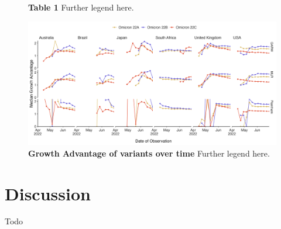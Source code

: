 \documentclass[11pt,oneside,letterpaper]{article}
\begin{document}
\begin{figure}[h]
	\caption{\textbf{Table 1}
	Further legend here.
	}
	\label{table1}
\end{figure}















\begin{figure}[h]
	\centering
	\includegraphics[width=1.0\textwidth]{figures/Figure3.png}
	\caption{\textbf{Growth Advantage of variants over time}
	Further legend here.
	}
	\label{Figure 3}
\end{figure}







\section*{Discussion}

Todo



\end{document}
